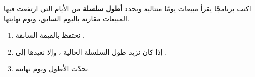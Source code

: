 \begin{statement}
اكتب برنامجًا يقرأ مبيعات  يومًا متتالية ويحدد \textbf{أطول سلسلة} من الأيام التي ارتفعت فيها المبيعات مقارنة باليوم السابق، ويوم نهايتها.
\end{statement}
\begin{stepsbox}\begin{enumerate}
\item نحتفظ بالقيمة السابقة .
\item إذا كان  نزيد طول السلسلة الحالية ، وإلا نعيدها إلى .
\item نحدّث الأطول  ويوم نهايته.
\end{enumerate}\end{stepsbox}
